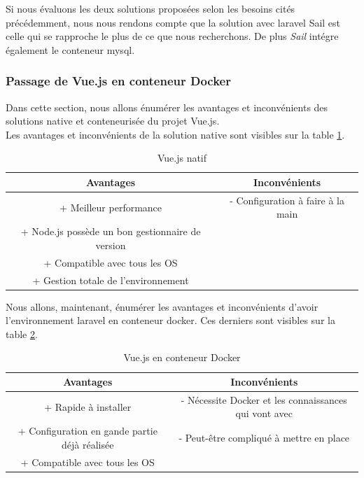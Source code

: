 \documentclass[
    iai, %
    il, %
]{heig-tb}
\begin{document}
Si nous évaluons les deux solutions proposées selon les besoins cités précédemment, nous nous rendons compte que la solution avec \Gls{laravel} Sail est celle qui se rapproche le plus de ce que nous recherchons. De plus \emph{Sail} intégre également le \Gls{conteneur} \Gls{mysql}.

\subsubsection{Passage de Vue.js en conteneur Docker}
Dans cette section, nous allons énumérer les avantages et inconvénients des solutions native et conteneurisée du projet Vue.js. \\
Les avantages et inconvénients de la solution native sont visibles sur la table \ref{dev-vuejs-native}.

\begin{table}[h]
    \begin{center}
        \caption{Vue.js natif \label{dev-vuejs-native}}
        \begin{tabular}{c|c}
            Avantages                                        & Inconvénients                     \\ \hline
            + Meilleur performance                           & - Configuration à faire à la main \\
            + Node.js possède un bon gestionnaire de version &                                   \\
            + Compatible avec tous les OS                    &                                   \\
            + Gestion totale de l'environnement              &                                   \\
        \end{tabular}
    \end{center}
\end{table}

Nous allons, maintenant, énumérer les avantages et inconvénients d'avoir l'environnement \Gls{laravel} en
\Gls{conteneur} \Gls{docker}. Ces derniers sont visibles sur la table \ref{dev-vuejs-docker}.

\begin{table}[h]
    \begin{center}
        \caption{Vue.js en conteneur Docker \label{dev-vuejs-docker}}
        \begin{tabular}{c|c}
            Avantages                                     & Inconvénients                                         \\ \hline
            + Rapide à installer                          & - Nécessite Docker et les connaissances qui vont avec \\
            + Configuration en gande partie déjà réalisée & - Peut-être compliqué à mettre en place               \\
            + Compatible avec tous les OS                 &                                                       \\
        \end{tabular}
    \end{center}
\end{table}
\end{document}
